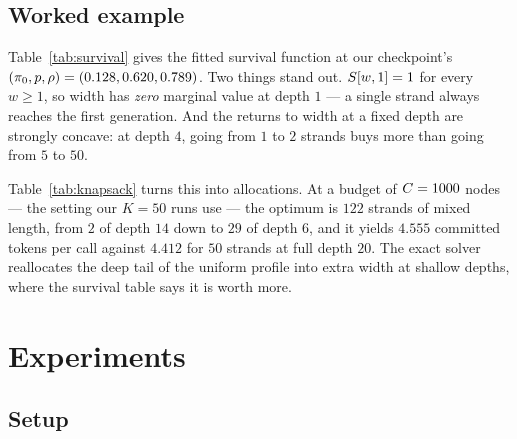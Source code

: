 \documentclass{article} %
\makeatletter
\newenvironment{ai}
  {\color{lightgray}%
   \@ifpackageloaded{caption}{\captionsetup{font={color=lightgray}}}{}%
   \let\ai@savedfloatreset\@floatboxreset
   \g@addto@macro\@floatboxreset{\color{lightgray}}}
  {\global\let\@floatboxreset\ai@savedfloatreset}
\makeatother
\begin{document}
\begin{ai}
\subsection{Worked example}
\label{sec:worked}

Table~\ref{tab:survival} gives the fitted survival function at our checkpoint's
$(\pizero, p, \rhoc) = (0.128, 0.620, 0.789)$. Two things stand out.
$S[w, 1] = 1$ for every $w \geq 1$, so width has \emph{zero} marginal value at
depth $1$ --- a single strand always reaches the first generation. And the
returns to width at a fixed depth are strongly concave: at depth $4$, going from
$1$ to $2$ strands buys more than going from $5$ to $50$.

Table~\ref{tab:knapsack} turns this into allocations. At a budget of
$C = 1000$ nodes --- the setting our $K = 50$ runs use --- the optimum is
$122$ strands of mixed length, from $2$ of depth $14$ down to $29$ of depth $6$,
and it yields $4.555$ committed tokens per call against $4.412$ for $50$ strands
at full depth $20$. The exact solver reallocates the deep tail of the uniform
profile into extra width at shallow depths, where the survival table says it is
worth more.

\begin{table}[t]
  \centering
  \caption{Fitted survival function $\Sfun[w, d] = \Pr[\extinct \geq d]$ for a
  homogeneous run of $w$ strands, at $(\pizero, p, \rhoc) = (0.128, 0.620,
  0.789)$. Width has no value at depth $1$ and sharply diminishing value
  thereafter.}
  \label{tab:survival}
  
\end{table}

\begin{table}[t]
  \centering
  \caption{Optimal versus uniform allocation of a node budget, under the fitted
  model. The profile column reads $\mathrm{depth}^{\mathrm{count}}$, so
  $6^{29}$ means $29$ strands of length $6$. The exact profile trades depth for
  width and gains $\approx 0.15$ committed tokens per call.}
  \label{tab:knapsack}
  
\end{table}

\section{Experiments}
\label{sec:experiments}

\subsection{Setup}


\end{ai}
\end{document}
